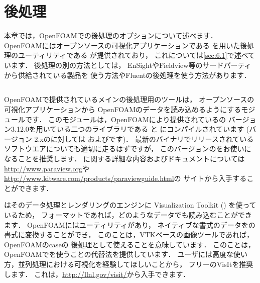 \chapter{後処理}
\label{chap:6}
%
本章では，OpenFOAMでの後処理のオプションについて述べます．
OpenFOAMにはオープンソースの可視化アプリケーションである
を用いた後処理のユーティリティである
が提供されており，
これについては\autoref{sec:6.1}で述べています．
後処理の別の方法としては，
EnSightやFieldview等のサードパーティから供給されている製品を
使う方法やFluentの後処理を使う方法があります．



\section{}
\label{sec:6.1}
%
%
%
%
%
%
OpenFOAMで提供されているメインの後処理用のツールは，
オープンソースの可視化アプリケーションから
OpenFOAMのデータを読み込めるようにするモジュールです．
このモジュールは，OpenFOAMにより提供されているの
バージョン3.12.0を用いている二つのライブラリである
%
%
と
%
%
にコンパイルされています (バージョン
2.xのに対しては
およびです)．
最新のバイナリでリリースされているソフトウエアについても適切に走るはずですが，
このバージョンのをお使いになることを推奨します．
に関する詳細な内容およびドキュメントについては
\url{http://www.paraview.org}や
\url{http://www.kitware.com/products/paraviewguide.html}の
サイトから入手することができます．

はそのデータ処理とレンダリングのエンジンに
Visualization Toolkit () を使っているため，
フォーマットであれば，どのようなデータでも読み込むことができます．
OpenFOAMにはユーティリティがあり，
ネイティブな書式のデータをの書式に変換することができ，
このことは，VTKベースの画像ツールであれば，OpenFOAMのcaseの
後処理として使えることを意味しています．
このことは，OpenFOAMでを使うことの代替法を提供しています．
ユーザには高度な使い方，並列処理における可視化を経験してほしいことから，
フリーのVisItを推奨します．
これは，\url{http://llnl.gov/visit/}から入手できます．

